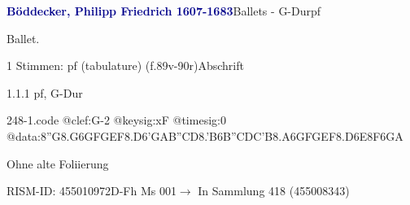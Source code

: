 \documentclass[twocolumn]{book}
\begin{document}
\par \vspace{7pt} \textcolor{darkblue}{\textbf{Böddecker, Philipp Friedrich  1607-1683}}\hfillplus{\textbf{[248]}}\newline Ballets - G-Dur\newline pf
\par \begin{itshape}[f.89v, at left:] Ballet.\end{itshape} 
\par \textcolor{darkblue}{}  1 Stimmen: pf (tabulature)  (f.89v-90r)\newline Abschrift
\par 1.1.1  pf, G-Dur  
\begin{filecontents*}{248-1.code}
@clef:G-2
@keysig:xF
@timesig:0
@data:8''G{8.G6G}{FGEF}{8.D6'G}{AB''CD}{8.'B6B}{''CDC'B}{8.A6G}{FGEF}{8.D6E}{8F6GA}
\end{filecontents*}
\newline
%
\par Ohne alte Foliierung
\par RISM-ID: 455010972\newline D-Fh  Ms 001\newline $\rightarrow$ In Sammlung 418 (455008343)
      
\end{document}
